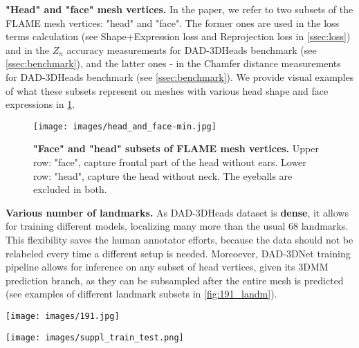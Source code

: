 \documentclass[10pt,twocolumn,letterpaper]{article}
\begin{document}
\bigskip

\textbf{"Head" and "face" mesh vertices.} In the paper, we refer to two subsets of the FLAME mesh vertices: "head" and "face". 
The former ones are used in the loss terms calculation (see Shape+Expression loss and Reprojection loss in \cref{ssec:loss}) and in the $Z_n$ accuracy measurements for DAD-3DHeads benchmark (see \cref{ssec:benchmark}), and the latter ones - in the Chamfer distance measurements for DAD-3DHeads benchmark (see \cref{ssec:benchmark}). 
We provide visual examples of what these subsets represent on meshes with various head shape and face expressions in \cref{fig:head_and_face}.

\begin{figure}[h]\centering
\texttt{[image: images/head\_and\_face-min.jpg]}
  \caption{\textbf{"Face" and "head" subsets of FLAME mesh vertices.} Upper row: "face", capture frontal part of the head without ears. Lower row: "head", capture the head without neck. The eyeballs are excluded in both.}
  \vspace{-1em}
  \label{fig:head_and_face}
\end{figure}

\bigskip

\textbf{Various number of landmarks.} As DAD-3DHeads dataset is \textbf{dense}, it allows for training different models, localizing many more than the usual 68 landmarks\cite{multipie}. This flexibility saves the human annotator efforts, because the data should not be relabeled every time a different setup is needed. Moreoever, DAD-3DNet training pipeline allows for inference on any subset of head vertices, given its 3DMM prediction branch, as they can be subsampled after the entire mesh is predicted (see examples of different landmark subsets in \cref{fig:191_landm}).
\begin{figure*}[t!]\centering
\texttt{[image: images/191.jpg]}
  \caption{DAD-3DHeads dataset allows for flexibly choosing the desired landmark subset for predicting as many dense landmarks as needed. Left to right: 68 landmarks \cite{multipie}, 191 landmarks, 445 landmarks.}
  \vspace{-1em}
  \label{fig:191_landm}
\end{figure*}



\begin{figure*}[t!]
     \centering
\texttt{[image: images/suppl\_train\_test.png]}
     \caption{Attribute labels (gender, age, illumination, and image quality) and the distribution across ethnic groups in DAD-3DHeads.}
     \label{fig:histogramss}
\end{figure*}
\end{document}
